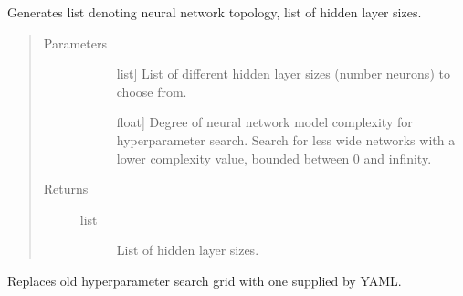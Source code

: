 \documentclass[letterpaper,10pt,english]{sphinxmanual}
\begin{document}
\begin{fulllineitems}
\label{\detokenize{index:methylnet.hyperparameter_scans.generate_topology}}
Generates list denoting neural network topology, list of hidden layer sizes.
\begin{quote}\begin{description}
\item[{Parameters}] \leavevmode\begin{description}
\item[{}] \leavevmode{[}list{]}
List of different hidden layer sizes (number neurons) to choose from.

\item[{}] \leavevmode{[}float{]}
Degree of neural network model complexity for hyperparameter search. Search for less wide networks with a lower complexity value, bounded between 0 and infinity.

\end{description}

\item[{Returns}] \leavevmode\begin{description}
\item[{list}] \leavevmode
List of hidden layer sizes.

\end{description}

\end{description}\end{quote}

\end{fulllineitems}


\begin{fulllineitems}
\label{\detokenize{index:methylnet.hyperparameter_scans.replace_grid}}
Replaces old hyperparameter search grid with one supplied by YAML.

\end{fulllineitems}
\end{document}
